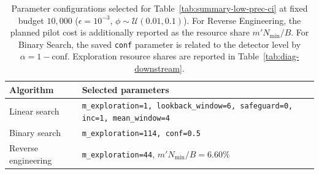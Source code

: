 \begin{table}[ht]
\centering
\footnotesize
\caption{Parameter configurations selected for Table~\ref{tab:summary-low-prec-ci} at fixed budget $10{,}000$ ($\epsilon=10^{-3}$, $\phi\sim\mathcal{U}(0.01,0.1)$). For Reverse Engineering, the planned pilot cost is additionally reported as the resource share $m'N_{\min}/B$. For Binary Search, the saved \texttt{conf} parameter is related to the detector level by $\alpha=1-\mathrm{conf}$. Exploration resource shares are reported in Table~\ref{tab:diag-downstream}.}
\label{tab:opt-param-first-tab}
\begin{tabular}{ll}
\toprule
Algorithm
& Selected parameters \\
\midrule
Linear search
& \texttt{m\_exploration=1, lookback\_window=6, safeguard=0, inc=1, mean\_window=4} \\
Binary search
& \texttt{m\_exploration=114, conf=0.5} \\
Reverse engineering
& \texttt{m\_exploration=44}, $m'N_{\min}/B=6.60\%$ \\
\bottomrule
\end{tabular}
\end{table}
